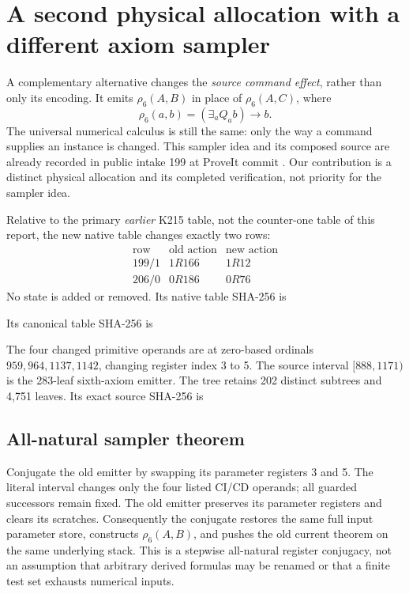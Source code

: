 \section{A second physical allocation with a different axiom sampler}
\label{sec:rho6-alternative}
A complementary alternative changes the \emph{source command effect}, rather than only its encoding. It emits $\rho_6(A,B)$ in place of $\rho_6(A,C)$, where
\[
 \rho_6(a,b)=(\exists_a Q_a b)\to b.
\]
The universal numerical calculus is still the same: only the way a command supplies an instance is changed. This sampler idea and its composed source are already recorded in public intake 199 at ProveIt commit
. Our contribution is a distinct physical allocation and its completed verification, not priority for the sampler idea.

Relative to the primary \emph{earlier} K215 table, not the counter-one table of this report, the new native table changes exactly two rows:
\[
\begin{array}{c|c|c}
\text{row}&\text{old action}&\text{new action}\\\hline
199/1&1R166&1R12\\
206/0&0R186&0R76
\end{array}
\]
No state is added or removed. Its native table SHA-256 is
\begin{quote}\small{}\end{quote}
Its canonical table SHA-256 is
\begin{quote}\small{}\end{quote} The four changed primitive operands are at zero-based ordinals $959,964,1137,1142$, changing register index 3 to 5. The source interval $[888,1171)$ is the 283-leaf sixth-axiom emitter. The tree retains 202 distinct subtrees and 4,751 leaves. Its exact source SHA-256 is
\begin{quote}\small{}\end{quote}

\subsection{All-natural sampler theorem}
Conjugate the old emitter by swapping its parameter registers 3 and 5. The literal interval changes only the four listed CI/CD operands; all guarded successors remain fixed. The old emitter preserves its parameter registers and clears its scratches. Consequently the conjugate restores the same full input parameter store, constructs $\rho_6(A,B)$, and pushes the old current theorem on the same underlying stack. This is a stepwise all-natural register conjugacy, not an assumption that arbitrary derived formulas may be renamed or that a finite test set exhausts numerical inputs.

